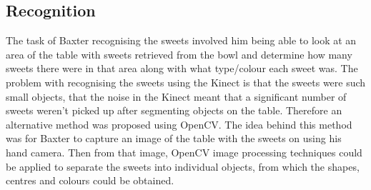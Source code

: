 \subsection{Recognition}
The task of Baxter recognising the sweets involved him being able to look at an area of the table with sweets retrieved from the bowl and determine how many sweets there were in that area along with what type/colour each sweet was. The problem with recognising the sweets using the Kinect is that the sweets were such small objects, that the noise in the Kinect meant that a significant number of sweets weren't picked up after segmenting objects on the table. Therefore an alternative method was proposed using OpenCV. The idea behind this method was for Baxter to capture an image of the table with the sweets on using his hand camera. Then from that image, OpenCV image processing techniques could be applied to separate the sweets into individual objects, from which the shapes, centres and colours could be obtained.
